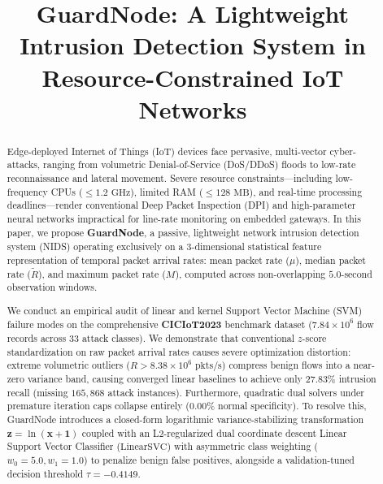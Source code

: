 \documentclass[conference]{IEEEtran}
\begin{document}
\title{GuardNode: A Lightweight Intrusion Detection System in Resource-Constrained IoT Networks}

\author{
}

\maketitle

\begin{abstract}
Edge-deployed Internet of Things (IoT) devices face pervasive, multi-vector cyber-attacks, ranging from volumetric Denial-of-Service (DoS/DDoS) floods to low-rate reconnaissance and lateral movement. Severe resource constraints---including low-frequency CPUs ($\le 1.2\text{ GHz}$), limited RAM ($\le 128\text{ MB}$), and real-time processing deadlines---render conventional Deep Packet Inspection (DPI) and high-parameter neural networks impractical for line-rate monitoring on embedded gateways. In this paper, we propose \textbf{GuardNode}, a passive, lightweight network intrusion detection system (NIDS) operating exclusively on a 3-dimensional statistical feature representation of temporal packet arrival rates: mean packet rate ($\mu$), median packet rate ($\tilde{R}$), and maximum packet rate ($M$), computed across non-overlapping $5.0$-second observation windows.

We conduct an empirical audit of linear and kernel Support Vector Machine (SVM) failure modes on the comprehensive \textbf{CICIoT2023} benchmark dataset ($7.84 \times 10^6$ flow records across 33 attack classes). We demonstrate that conventional $z$-score standardization on raw packet arrival rates causes severe optimization distortion: extreme volumetric outliers ($R > 8.38 \times 10^6\text{ pkts/s}$) compress benign flows into a near-zero variance band, causing converged linear baselines to achieve only $27.83\%$ intrusion recall (missing $165,868$ attack instances). Furthermore, quadratic dual solvers under premature iteration caps collapse entirely ($0.00\%$ normal specificity). To resolve this, GuardNode introduces a closed-form logarithmic variance-stabilizing transformation $\mathbf{z} = \ln(\mathbf{x} + \mathbf{1})$ coupled with an L2-regularized dual coordinate descent Linear Support Vector Classifier ($\text{LinearSVC}$) with asymmetric class weighting ($w_0 = 5.0, w_1 = 1.0$) to penalize benign false positives, alongside a validation-tuned decision threshold $\tau = -0.4149$.


\end{abstract}
\end{document}
